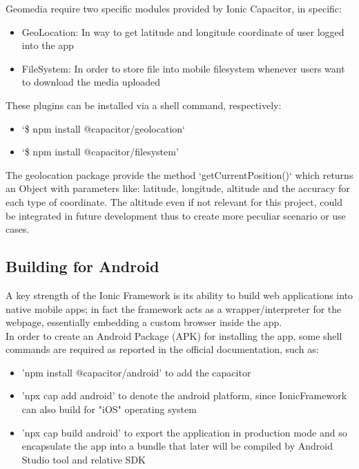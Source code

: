 \documentclass[conference]{IEEEtran}
\begin{document}
Geomedia require two specific modules provided by Ionic Capacitor, in specific:
\begin{itemize}
    \item GeoLocation\cite{b2}: In way to get latitude and longitude coordinate of user logged into the app
    \item FileSystem\cite{b3}: In order to store file into mobile filesystem whenever users want to download the media uploaded
\end{itemize}

These plugins can be installed via a shell command, respectively:
\begin{itemize}
    \item `\$ npm install @capacitor/geolocation`
    \item `\$ npm install @capacitor/filesystem'
\end{itemize}

The geolocation package provide the method `getCurrentPosition()` which returns an Object with parameters like: latitude, longitude, altitude and the accuracy for each type of coordinate. The altitude even if not relevant for this project, could be integrated in future development thus to create more peculiar scenario or use cases.


\subsection{Building for Android}

A key strength of the Ionic Framework is its ability to build web applications into native mobile apps; in fact the framework acts as a wrapper/interpreter for the webpage, essentially embedding a custom browser inside the app.
\\
In order to create an Android Package (APK) for installing the app, some shell commands are required as reported in the official documentation, such as:
\begin{itemize}
    \item 'npm install @capacitor/android' to add the capacitor
    \item  'npx cap add android' to denote the android platform, since IonicFramework can also build for "iOS" operating system
    \item 'npx cap build android' to export the application in production mode and so encapsulate the app into a bundle that later will be compiled by Android Studio\cite{11} tool and relative SDK 
\end{itemize}
\end{document}
